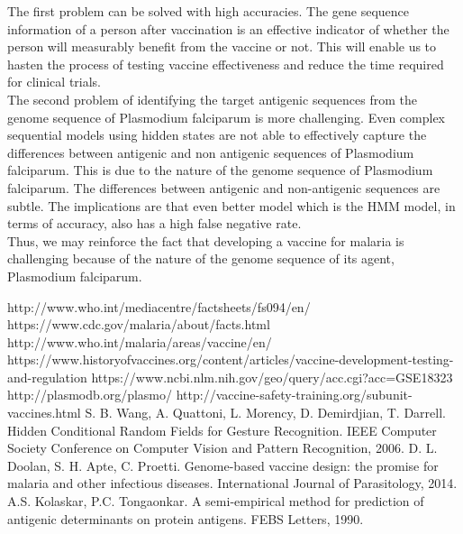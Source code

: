 \documentclass[notitlepage]{article}
\begin{document}
	The first problem can be solved with high accuracies. The gene sequence information of a person after vaccination is an effective indicator of whether the person will measurably benefit from the vaccine or not. This will enable us to hasten the process of testing vaccine effectiveness and reduce the time required for clinical trials.
	\\The second problem of identifying the target antigenic sequences from the genome sequence of Plasmodium falciparum is more challenging. Even complex sequential models using hidden states are not able to effectively capture the differences between antigenic and non antigenic sequences of Plasmodium falciparum. This is due to the nature of the genome sequence of Plasmodium falciparum. The differences between antigenic and non-antigenic sequences are subtle. The implications are that even better model which is the HMM model, in terms of accuracy, also has a high false negative rate.   
	\\Thus, we may reinforce the fact that developing a vaccine for malaria is challenging because of the nature of the genome sequence of its agent, Plasmodium falciparum. 
	
	\begin{thebibliography}{1}
		
		http://www.who.int/mediacentre/factsheets/fs094/en/
		https://www.cdc.gov/malaria/about/facts.html
		http://www.who.int/malaria/areas/vaccine/en/
		https://www.historyofvaccines.org/content/articles/vaccine-development-testing-and-regulation
		https://www.ncbi.nlm.nih.gov/geo/query/acc.cgi?acc=GSE18323
		http://plasmodb.org/plasmo/
		http://vaccine-safety-training.org/subunit-vaccines.html
		S. B. Wang, A. Quattoni, L. Morency, D. Demirdjian, T. Darrell. Hidden Conditional Random Fields for Gesture Recognition. IEEE Computer Society Conference on Computer Vision and Pattern Recognition, 2006. 
		D. L. Doolan, S. H. Apte, C. Proetti. Genome-based vaccine design: the promise for malaria and other infectious diseases. International Journal of Parasitology, 2014.
		A.S. Kolaskar, P.C. Tongaonkar. A semi-empirical method for prediction of antigenic determinants on protein antigens. FEBS Letters, 1990.
		
	\end{thebibliography}
	
\end{document}
